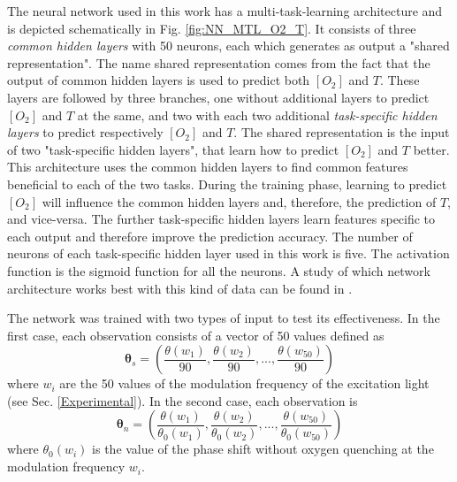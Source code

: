 \documentclass[9pt,twocolumn,twoside,pdftex]{optica}
\begin{document}
The neural network used in this work has a multi-task-learning architecture and is depicted schematically in Fig. \ref{fig:NN_MTL_O2_T}. It consists of three {\sl common hidden layers} with 50 neurons, each which generates as output a "shared representation". The name shared representation comes from the fact that the output of common hidden layers is used to predict both $[O_2]$ and $T$. These layers are followed by three branches, one without additional layers to predict $[O_2]$ and $T$ at the same, and two with each two additional {\sl task-specific hidden layers} to predict respectively $[O_2]$ and $T$. The shared representation is the input of two "task-specific hidden layers", that learn how to predict $[O_2]$ and $T$ better. This architecture uses the common hidden layers to find common features beneficial to each of the two tasks. During the training phase, learning to predict $[O_2]$ will influence the common hidden layers and, therefore, the prediction of $T$, and vice-versa. The further task-specific hidden layers learn features specific to each output and therefore improve the prediction accuracy. The number of neurons of each task-specific hidden layer used in this work is five. The activation function is the sigmoid function for all the neurons.  A study of which network architecture works best with this kind of data can be found in \cite{Michelucci2019_2}.

The network was trained with two types of input to test its effectiveness. In the first case, each observation consists of a vector of 50 values defined as
\begin{equation}
\label{input1}
{\pmb \theta}_s = \left(
\frac{\theta(w_1)}{90} , \frac{\theta(w_2)}{90} , ..., \frac{\theta(w_{50})}{90} 
\right)
\end{equation}
where $w_i$ are the 50 values of the modulation frequency of the excitation light (see Sec. \ref{Experimental}).
In the second case, each observation is
\begin{equation}
\label{input2}
{\pmb \theta}_n = \left(
\frac{\theta(w_1)}{\theta_0(w_1)} , \frac{\theta(w_2)}{\theta_0(w_2)} , ..., \frac{\theta(w_{50})}{\theta_0(w_{50})} 
\right)
\end{equation}
where $\theta_0(w_i)$ is the value of the phase shift without oxygen quenching at the modulation frequency $w_i$.
\end{document}
